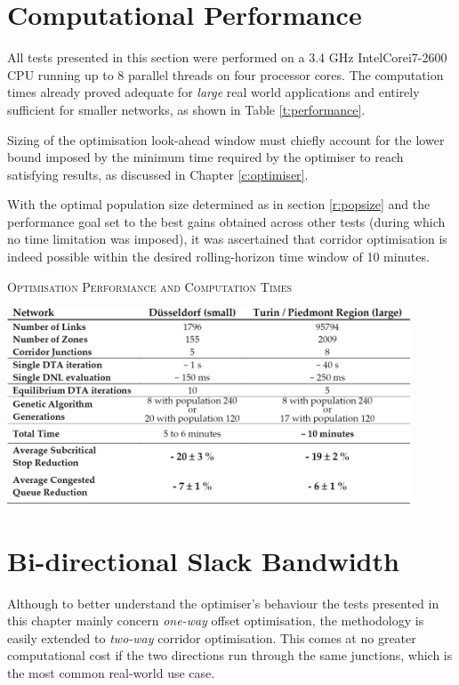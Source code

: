 \section{Computational Performance} \label{res:performance}
All tests presented in this section were performed on a 3.4 GHz Intel\textregistered Core\texttrademark i7-2600 CPU running up to 8 parallel threads on four processor cores. The computation times already proved adequate for \emph{large} real world applications and entirely sufficient for smaller networks, as shown in Table \ref{t:performance}.

Sizing of the optimisation look-ahead window must chiefly account for the lower bound imposed by the minimum time required by the optimiser to reach satisfying results, as discussed in Chapter \ref{c:optimiser}.

With the optimal population size determined as in section \ref{r:popsize} and the performance goal set to the best gains obtained across other tests (during which no time limitation was imposed), it was ascertained that corridor optimisation is indeed possible within the desired rolling-horizon time window of 10 minutes.

\begin{table}[h]
\caption{\textsc{Optimisation Performance and Computation Times}} \label{t:performance}
\begin{center}
\includegraphics[width=0.9\textwidth]{PIX/RES/perftable.png}
\end{center}
\end{table}


\section{Bi-directional Slack Bandwidth} \label{res:slack}
Although to better understand the optimiser's behaviour the tests presented in this chapter mainly concern \emph{one-way} offset optimisation, the methodology is easily extended to \emph{two-way} corridor optimisation. This comes at no greater computational cost if the two directions run through the same junctions, which is the most common real-world use case.

